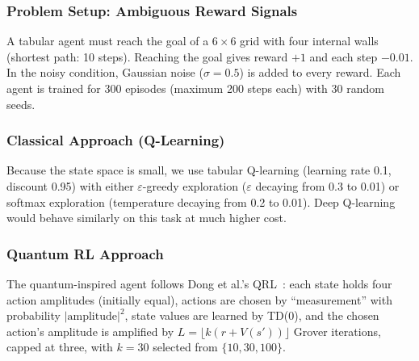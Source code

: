 \documentclass[pdflatex,sn-basic]{sn-jnl}
\begin{document}
\subsubsection{Problem Setup: Ambiguous Reward Signals}
A tabular agent must reach the goal of a $6 \times 6$ grid with four internal walls (shortest path: 10 steps). Reaching the goal gives reward $+1$ and each step $-0.01$. In the noisy condition, Gaussian noise ($\sigma = 0.5$) is added to every reward. Each agent is trained for 300 episodes (maximum 200 steps each) with 30 random seeds.

\subsubsection{Classical Approach (Q-Learning)}
Because the state space is small, we use tabular Q-learning (learning rate 0.1, discount 0.95) with either $\varepsilon$-greedy exploration ($\varepsilon$ decaying from 0.3 to 0.01) or softmax exploration (temperature decaying from 0.2 to 0.01). Deep Q-learning would behave similarly on this task at much higher cost.

\subsubsection{Quantum RL Approach}
The quantum-inspired agent follows Dong et al.'s QRL~\citep{Dong2008}: each state holds four action amplitudes (initially equal), actions are chosen by ``measurement'' with probability $|\text{amplitude}|^2$, state values are learned by TD(0), and the chosen action's amplitude is amplified by $L = \lfloor k(r + V(s')) \rfloor$ Grover iterations, capped at three, with $k = 30$ selected from $\{10, 30, 100\}$.
\end{document}
